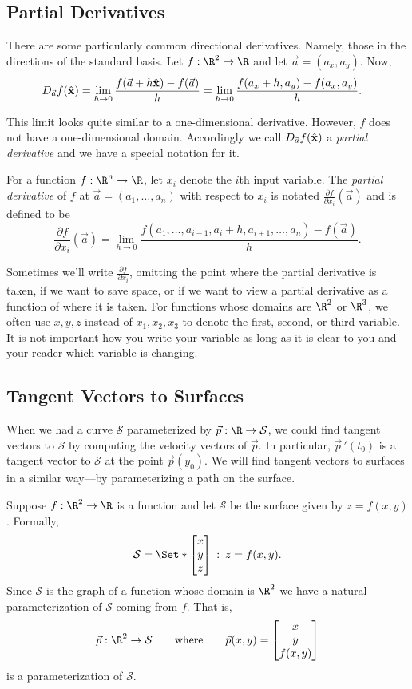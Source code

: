 \subsection{Partial Derivatives}
There are some particularly common directional derivatives.  Namely, those in the directions
of the standard basis.  Let $f:\R^2\to\R$ and let $\vec a=(a_x,a_y)$.  Now,
\begin{align*}
	D_{\vec a}f({\hat {\mathbf x}}) &= \lim_{h\to0}\frac{f(\vec a+h{\hat {\mathbf x}})-f(\vec a)}{h}
	=\lim_{h\to0}\frac{f(a_x+h, a_y)-f(a_x,a_y)}{h}.
\end{align*}

This limit looks quite similar to a one-dimensional derivative.  However, $f$ does not
have a one-dimensional domain.  Accordingly we call $D_{\vec a}f({\hat {\mathbf x}})$ a 
\emph{partial derivative} and we have a special notation for it.

\begin{definition}
	For a function $f:\R^n\to\R$, let $x_i$ denote the $i$th input variable.
	The \emph{partial derivative} of $f$ at $\vec a=(a_1,\ldots,a_n)$ with respect to $x_i$ is 
	notated $\frac{\partial f}{\partial x_i}(\vec a)$ and is defined to be
	\[
		\frac{\partial f}{\partial x_i}(\vec a) = 
		\lim_{h\to0}\frac{f(a_1,\ldots,a_{i-1},a_i+h,a_{i+1},\ldots,a_n)-f(\vec a)}{h}.
	\]
\end{definition}
Sometimes we'll write $\frac{\partial f}{\partial x_i}$, omitting the point where the partial
derivative is taken, if we want to save space, or if we want to view a partial derivative as a function
of where it is taken.  For functions whose domains are $\R^2$ or $\R^3$, we often use $x,y,z$ 
instead of $x_1,x_2,x_3$ to denote
the first, second, or third variable.  It is not important how you write your variable as long
as it is clear to you and your reader which variable is changing.

\subsection{Tangent Vectors to Surfaces}
When we had a curve $\mathcal S$ parameterized by $\vec p:\R\to\mathcal S$,
we could find tangent vectors to $\mathcal S$ by computing the velocity vectors of $\vec p$.
In particular, $\vec p\,'(t_0)$ is a tangent vector to $\mathcal S$ at the point $\vec p(y_0)$.
We will find tangent vectors to surfaces in a similar way---by parameterizing a path on the surface.

Suppose $f:\R^2\to \R$ is a function and let $\mathcal S$ be the surface given by $z=f(x,y)$.  Formally,
\[
	\mathcal S=\Set*{\matc{x\\y\\z}\given z=f(x,y)}.
\]
Since $\mathcal S$ is the graph of a function whose domain is $\R^2$ we have a natural parameterization
of $\mathcal S$ coming from $f$.  That is,
\[
	\vec p:\R^2\to\mathcal S\qquad\text{where}\qquad \vec p(x,y)=\matc{x\\y\\f(x,y)}
\]
is a parameterization of $\mathcal S$.

